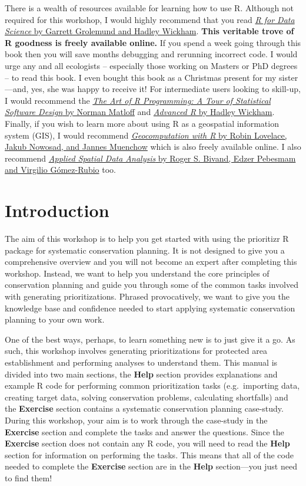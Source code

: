\documentclass[]{book}
\begin{document}
There is a wealth of resources available for learning how to use R.
Although not required for this workshop, I would highly recommend that
you read \href{https://r4ds.had.co.nz/}{\emph{R for Data Science} by
Garrett Grolemund and Hadley Wickham}. \textbf{This veritable trove of R
goodness is freely available online.} If you spend a week going through
this book then you will save months debugging and rerunning incorrect
code. I would urge any and all ecologists -- especially those working on
Masters or PhD degrees -- to read this book. I even bought this book as
a Christmas present for my sister---and, yes, she was happy to receive
it! For intermediate users looking to skill-up, I would recommend the
\href{http://shop.oreilly.com/product/9781593273842.do}{\emph{The Art of
R Programming: A Tour of Statistical Software Design} by Norman Matloff}
and \href{https://adv-r.hadley.nz/}{\emph{Advanced R} by Hadley
Wickham}. Finally, if you wish to learn more about using R as a
geospatial information system (GIS), I would recommend
\href{https://geocompr.robinlovelace.net/}{\emph{Geocomputation with R}
by Robin Lovelace, Jakub Nowosad, and Jannes Muenchow} which is also
freely available online. I also recommend
\href{https://www.springer.com/gp/book/9781461476177}{\emph{Applied
Spatial Data Analysis} by Roger S. Bivand, Edzer Pebesmam and Virgilio
Gómez-Rubio} too.

\chapter{Introduction}\label{introduction}

The aim of this workshop is to help you get started with using the
prioritizr R package for systematic conservation planning. It is not
designed to give you a comprehensive overview and you will not become an
expert after completing this workshop. Instead, we want to help you
understand the core principles of conservation planning and guide you
through some of the common tasks involved with generating
prioritizations. Phrased provocatively, we want to give you the
knowledge base and confidence needed to start applying systematic
conservation planning to your own work.

One of the best ways, perhaps, to learn something new is to just give it
a go. As such, this workshop involves generating prioritizations for
protected area establishment and performing analyses to understand them.
This manual is divided into two main sections, the \textbf{Help} section
provides explanations and example R code for performing common
prioritization tasks (e.g.~importing data, creating target data, solving
conservation problems, calculating shortfalls) and the \textbf{Exercise}
section contains a systematic conservation planning case-study. During
this workshop, your aim is to work through the case-study in the
\textbf{Exercise} section and complete the tasks and answer the
questions. Since the \textbf{Exercise} section does not contain any R
code, you will need to read the \textbf{Help} section for information on
performing the tasks. This means that all of the code needed to complete
the \textbf{Exercise} section are in the \textbf{Help} section---you
just need to find them!
\end{document}
